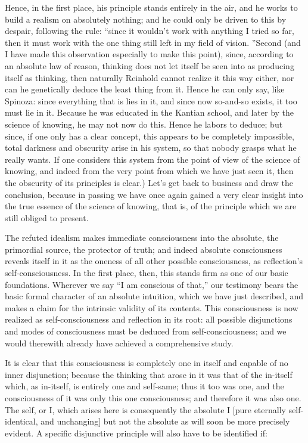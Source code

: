 Hence, in the first place, his principle stands entirely in the air,
and he works to build a realism on absolutely nothing;
and he could only be driven to this by despair, following the rule:
“since it wouldn't work with anything I tried so far,
then it must work with the one thing still left in my field of vision.
”Second (and I have made this observation especially to make this point),
since, according to an absolute law of reason,
thinking does not let itself be seen into
as producing itself as thinking,
then naturally Reinhold cannot realize it this way either,
nor can he genetically deduce the least thing from it.
Hence he can only say, like Spinoza:
since everything that is lies in it,
and since now so-and-so exists,
it too must lie in it.
Because he was educated in the Kantian school,
and later by the science of knowing,
he may not now do this.
Hence he labors to deduce;
but since, if one only has a clear concept,
this appears to be completely impossible,
total darkness and obscurity arise in his system,
so that nobody grasps what he really wants.
If one considers this system from
the point of view of the science of knowing,
and indeed from the very point from
which we have just seen it,
then the obscurity of its principles is clear.)
Let's get back to business and draw the conclusion,
because in passing we have once again gained
a very clear insight into the true essence
of the science of knowing, that is,
of the principle which we are still obliged to present.

The refuted idealism makes immediate consciousness
into the absolute, the primordial source, the protector of truth;
and indeed absolute consciousness reveals itself in it
as the oneness of all other possible consciousness,
as reflection's self-consciousness.
In the first place, then, this stands firm
as one of our basic foundations.
Wherever we say “I am conscious of that,”
our testimony bears the basic formal character
of an absolute intuition,
which we have just described,
and makes a claim for the intrinsic validity of its contents.
This consciousness is now realized as self-consciousness
and reflection in its root:
all possible disjunctions and modes of consciousness
must be deduced from self-consciousness;
and we would therewith already
have achieved a comprehensive study.

It is clear that this consciousness is
completely one in itself
and capable of no inner disjunction;
because the thinking that arose in it was
that of the in-itself
which, as in-itself, is
entirely one and self-same;
thus it too was one,
and the consciousness of it was
only this one consciousness;
and therefore it was also one.
The self, or I, which arises here is
consequently the absolute I
[pure eternally self-identical, and unchanging]
but not the absolute as will soon be more precisely evident.
A specific disjunctive principle will
also have to be identified if:

